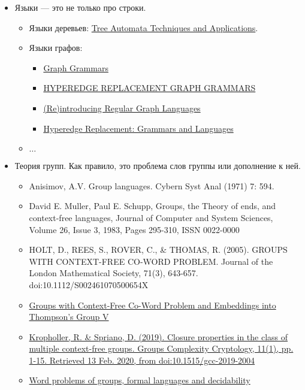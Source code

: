 \begin{itemize}
  \item Языки --- это не только про строки.
  \begin{itemize}
    \item Языки деревьев: \href{http://tata.gforge.inria.fr/}{Tree Automata Techniques and Applications}.
    \item Языки графов: 
    \begin{itemize}
      \item \href{http://www.its.caltech.edu/~matilde/GraphGrammarsLing.pdf}{Graph Grammars}
      \item \href{https://people.cs.umu.se/drewes/biblio/ps-files/hrg.pdf}{HYPEREDGE REPLACEMENT GRAPH GRAMMARS}
      \item \href{https://www.aclweb.org/anthology/W17-3410.pdf}{(Re)introducing Regular Graph Languages}
      \item \href{https://www.springer.com/gp/book/9783540560050}{Hyperedge Replacement: Grammars and Languages}
    \end{itemize}
    \item $\ldots$
  \end{itemize}
  \item Теория групп. Как правило, это проблема слов группы или дополнение к ней.
  \begin{itemize}
    \item Anisimov, A.V. Group languages. Cybern Syst Anal (1971) 7: 594.
    \item David E. Muller, Paul E. Schupp, Groups, the Theory of ends, and context-free languages, Journal of Computer and System Sciences, Volume 26, Issue 3, 1983, Pages 295-310, ISSN 0022-0000
    \item HOLT, D., REES, S., ROVER, C., \& THOMAS, R. (2005). GROUPS WITH CONTEXT-FREE CO-WORD PROBLEM. Journal of the London Mathematical Society, 71(3), 643-657. doi:10.1112/S002461070500654X
    \item \href{https://arxiv.org/abs/1407.7745}{Groups with Context-Free Co-Word Problem and Embeddings into Thompson's Group V} 
    \item \href{https://www.degruyter.com/view/j/gcc.2019.11.issue-1/gcc-2019-2004/gcc-2019-2004.xml}{Kropholler, R. \& Spriano, D. (2019). Closure properties in the class of multiple context-free groups. Groups Complexity Cryptology, 11(1), pp. 1-15. Retrieved 13 Feb. 2020, from doi:10.1515/gcc-2019-2004}
    \item \href{https://personalpages.manchester.ac.uk/staff/Mark.Kambites/events/nbsan/nbsan17_thomas.pdf}{Word problems of groups, formal languages and decidability}
  \end{itemize}


\end{itemize}
